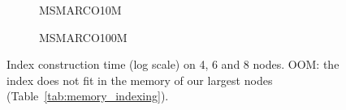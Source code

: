 \begin{figure}[t]
\begin{subfigure}[t]{0.495\textwidth}
  \hfill{}\hfill{}
  \caption{MSMARCO10M}\label{fig:build_time_msmarco10m}
\end{subfigure}\hfill
\begin{subfigure}[t]{0.495\textwidth}
  \hfill{}\hfill{}
  \caption{MSMARCO100M}\label{fig:build_time_msmarco100m}
\end{subfigure}
\caption{Index construction time (log scale) on 4, 6 and 8 nodes. OOM: the index does not fit in the memory of our largest nodes (Table~\ref{tab:memory_indexing}).}
\label{fig:build_time}
\end{figure}
